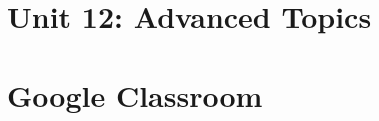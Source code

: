 \documentclass[catalan, a4paper, 12pt, titlepage]{article}
\begin{document}

%






\section{Unit 12: Advanced Topics}




\section{Google Classroom}

\end{document}
